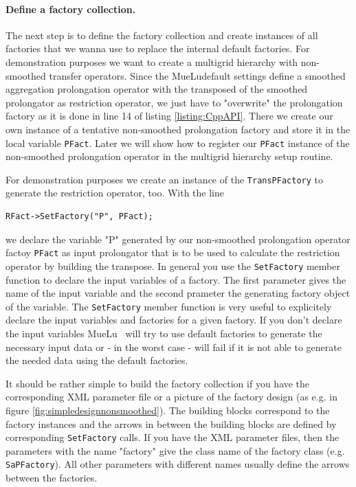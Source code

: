 \documentclass[12pt,a4paper]{article}
\newcommand{\MueLu}{MueLu}
\begin{document}
\paragraph{Define a factory collection.}
The next step is to define the factory collection and create instances of all factories that we wanna use to replace the internal default factories. For demonstration purposes we want to create a multigrid hierarchy with non-smoothed transfer operators. %
Since the \MueLu default settings define a smoothed aggregation prolongation operator with the transposed of the smoothed prolongator as restriction operator, we just have to "overwrite" the prolongation factory as it is done in line 14 of listing \ref{listing:CppAPI}. There we create our own instance of a tentative non-smoothed prolongation factory and store it in the local variable \verb|PFact|. Later we will show how to register our \verb|PFact| instance of the non-smoothed prolongation operator in the multigrid hierarchy setup routine.

For demonstration purposes we create an instance of the \verb|TransPFactory| to generate the restriction operator, too. With the line
\begin{verbatim}
RFact->SetFactory("P", PFact);
\end{verbatim}
we declare the variable "P" generated by our non-smoothed prolongation operator factoy \verb|PFact| as input prolongator that is to be used to calculate the restriction operator by building the transpose. In general you use the \verb|SetFactory| member function to declare the input variables of a factory. The first parameter gives the name of the input variable and the second prameter the generating factory object of the variable. The \verb|SetFactory| member function is very useful to explicitely declare the input variables and factories for a given factory. If you don't declare the input variables \MueLu~ will try to use default factories to generate the necessary input data or - in the worst case - will fail if it is not able to generate the needed data using the default factories.

It should be rather simple to build the factory collection if you have the corresponding XML parameter file or a picture of the factory design (as e.g. in figure \ref{fig:simpledesignnonsmoothed}). The building blocks correspond to the factory instances and the arrows in between the building blocks are defined by corresponding \verb|SetFactory| calls. If you have the XML parameter files, then the parameters with the name "factory" give the class name of the factory class (e.g. \verb|SaPFactory|). All other parameters with different names usually define the arrows between the factories.
\end{document}
